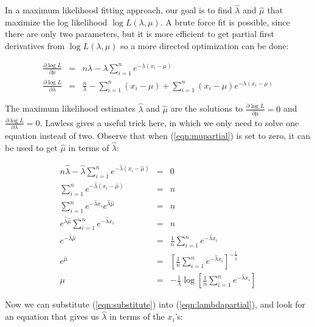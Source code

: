 In a maximum likelihood fitting approach, our goal is to find
$\hat{\lambda}$ and $\hat{\mu}$ that maximize the log likelihood $\log
L(\lambda, \mu)$. A brute force fit is possible, since there are only two
parameters, but it is more efficient to get partial first derivatives
from $\log L(\lambda,\mu)$ so a more directed optimization can be done:

\begin{eqnarray}
\frac{\partial \log L}{\partial \mu} & = &
n \lambda - \lambda \sum_{i=1}^{n} e^{-\lambda (x_i - \mu)}
\label{eqn:mupartial}
\\%
\frac{\partial \log L}{\partial \lambda} & = &
\frac{n}{\lambda} - \sum_{i=1}^{n} (x_i - \mu) +  
\sum_{i=1}^{n} (x_i - \mu) e^{-\lambda (x_i - \mu)}
\label{eqn:lambdapartial}
\end{eqnarray}

The maximum likelihood estimates $\hat{\lambda}$ and $\hat{\mu}$ are
the solutions to $\frac{\partial \log L}{\partial \mu} = 0$ and
$\frac{\partial \log L}{\partial \lambda} = 0$. Lawless gives a useful
trick here, in which we only need to solve one equation instead of
two.  Observe that when (\ref{eqn:mupartial}) is set to zero, it can be
used to get $\hat{\mu}$ in terms of $\hat{\lambda}$:

\begin{eqnarray}
n \hat{\lambda} - \hat{\lambda} \sum_{i=1}^{n} e^{-\hat{\lambda} (x_i - \hat{\mu})} & = & 0 \nonumber \\
%
\sum_{i=1}^{n} e^{-\hat{\lambda} (x_i - \hat{\mu})} & = & n \nonumber\\
%
\sum_{i=1}^{n} e^{-\hat{\lambda} x_i} e^{\hat{\lambda} \hat{\mu}} & = & n \nonumber\\
%
e^{\hat{\lambda} \hat{\mu}} \sum_{i=1}^{n} e^{-\hat{\lambda} x_i} & = & n \nonumber\\
%
e^{-\hat{\lambda} \hat{\mu}} & = & \frac{1}{n} \sum_{i=1}^{n} e^{-\hat{\lambda} x_i} 
\label{eqn:substitute}\\
%
e^{\hat{\mu}} & = & \left[ \frac{1}{n} \sum_{i=1}^{n}
e^{-\hat{\lambda} x_i} \right]^{-\frac{1}{\hat{\lambda}}}
\nonumber \\
%
\mu & = & - \frac{1}{\lambda} 
	\log \left[ \frac{1}{n} \sum_{i=1}^{n} e^{-\hat{\lambda} x_i} \right]
\label{eqn:solvemu}
\end{eqnarray}

Now we can substitute (\ref{eqn:substitute}) into
(\ref{eqn:lambdapartial}), and look for an equation that gives us
$\hat{\lambda}$ in terms of the $x_i$'s:

